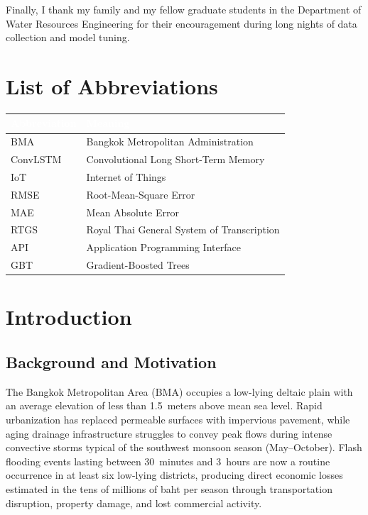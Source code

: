 \documentclass[12pt,a4paper]{report}
\begin{document}
\noindent
Finally, I thank my family and my fellow graduate students in the Department of Water Resources Engineering for their encouragement during long nights of data collection and model tuning.

\tableofcontents
\listoftables
\listoffigures

\chapter*{List of Abbreviations}
\begin{center}
\renewcommand{\arraystretch}{1.3}
\begin{tabularx}{\textwidth}{@{}l X@{}}
\toprule
\rowcolor{chulapink}
\textcolor{white}{\textbf{Abbreviation}} & \textcolor{white}{\textbf{Meaning}} \\
\midrule
BMA & Bangkok Metropolitan Administration \\
ConvLSTM & Convolutional Long Short-Term Memory \\
IoT & Internet of Things \\
RMSE & Root-Mean-Square Error \\
MAE & Mean Absolute Error \\
RTGS & Royal Thai General System of Transcription \\
API & Application Programming Interface \\
GBT & Gradient-Boosted Trees \\
\bottomrule
\end{tabularx}
\end{center}

\setcounter{page}{1}

\chapter{Introduction}

\section{Background and Motivation}
The Bangkok Metropolitan Area (BMA) occupies a low-lying deltaic plain with an average elevation of less than 1.5~meters above mean sea level. Rapid urbanization has replaced permeable surfaces with impervious pavement, while aging drainage infrastructure struggles to convey peak flows during intense convective storms typical of the southwest monsoon season (May--October). Flash flooding events lasting between 30~minutes and 3~hours are now a routine occurrence in at least six low-lying districts, producing direct economic losses estimated in the tens of millions of baht per season through transportation disruption, property damage, and lost commercial activity.
\end{document}
